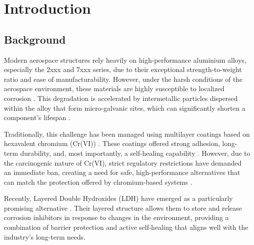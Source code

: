 \documentclass[11pt,twoside,a4paper]{report}
\begin{document}

\MakeCover


\tableofcontents

\listoffigures
\listoftables

\newpage


\chapter{Introduction}
\section{Background}
Modern aerospace structures rely heavily on high-performance aluminium alloys, especially the 2xxx and 7xxx series, due to their exceptional strength-to-weight ratio and ease of manufacturability. However, under the harsh conditions of the aerospace environment, these materials are highly susceptible to localized corrosion \cite{MartinezViademonte2020,Garg2025}. This degradation is accelerated by intermetallic particles dispersed within the alloy that form micro-galvanic sites, which can significantly shorten a component's lifespan \cite{MartinezViademonte2020,Becker2019,Garg2025}.

Traditionally, this challenge has been managed using multilayer coatings based on hexavalent chromium (Cr(VI)) \cite{MartinezViademonte2020,BoualiReview2020}. These coatings offered strong adhesion, long-term durability, and, most importantly, a self-healing capability \cite{MartinezViademonte2020,Becker2019,BoualiReview2020}. However, due to the carcinogenic nature of Cr(VI), strict regulatory restrictions have demanded an immediate ban, creating a need for safe, high-performance alternatives that can match the protection offered by chromium-based systems \cite{MartinezViademonte2020,Becker2019,Bouali2020}.

Recently, Layered Double Hydroxides (LDH) have emerged as a particularly promising alternative \cite{Cao2022,Becker2019,Bouali2020,Zhou2017,Iuzviuk2020,BoualiReview2020}. Their layered structure allows them to store and release corrosion inhibitors in response to changes in the environment, providing a combination of barrier protection and active self-healing that aligns well with the industry's long-term needs.
\end{document}
